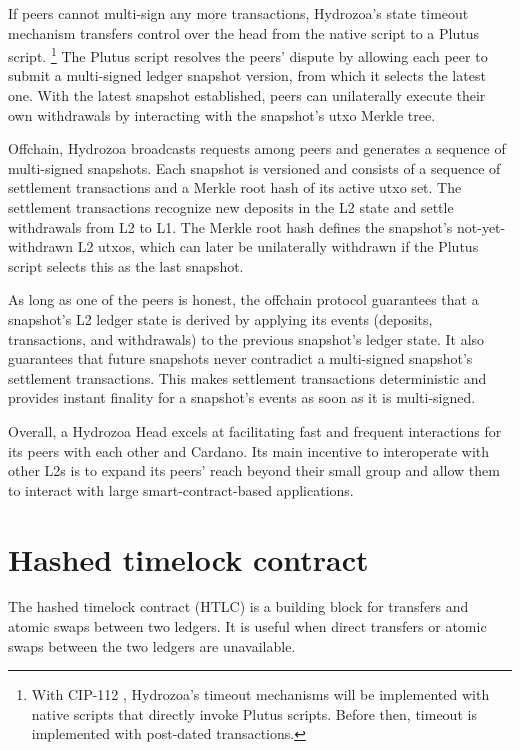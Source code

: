 \documentclass[11pt,a4paper,oneside]{article}
\begin{document}
\begin{multicols}{2}
If peers cannot multi-sign any more transactions, Hydrozoa's state timeout mechanism transfers control over the head from the native script to a Plutus script.%
\footnote{With CIP-112 \citep{DiSarroCIP112ObserveScript2024}, Hydrozoa's timeout mechanisms will be implemented with native scripts that directly invoke Plutus scripts.
Before then, timeout is implemented with post-dated transactions.}
The Plutus script resolves the peers' dispute by allowing each peer to submit a multi-signed ledger snapshot version, from which it selects the latest one.
With the latest snapshot established, peers can unilaterally execute their own withdrawals by interacting with the snapshot's utxo Merkle tree.

Offchain, Hydrozoa broadcasts requests among peers and generates a sequence of multi-signed snapshots.
Each snapshot is versioned and consists of a sequence of settlement transactions and a Merkle root hash of its active utxo set.
The settlement transactions recognize new deposits in the L2 state and settle withdrawals from L2 to L1.
The Merkle root hash defines the snapshot's not-yet-withdrawn L2 utxos, which can later be unilaterally withdrawn if the Plutus script selects this as the last snapshot.

As long as one of the peers is honest, the offchain protocol guarantees that a snapshot's L2 ledger state is derived by applying its events (deposits, transactions, and withdrawals) to the previous snapshot's ledger state.
It also guarantees that future snapshots never contradict a multi-signed snapshot's settlement transactions.
This makes settlement transactions deterministic and provides instant finality for a snapshot's events as soon as it is multi-signed.

Overall, a Hydrozoa Head excels at facilitating fast and frequent interactions for its peers with each other and Cardano.
Its main incentive to interoperate with other L2s is to expand its peers' reach beyond their small group and allow them to interact with large smart-contract-based applications.

\section{Hashed timelock contract}%
\label{h:hashed-timelock-contract}

The hashed timelock contract (HTLC) is a building block for transfers and atomic swaps between two ledgers.
It is useful when direct transfers or atomic swaps between the two ledgers are unavailable.


\end{multicols}
\end{document}

